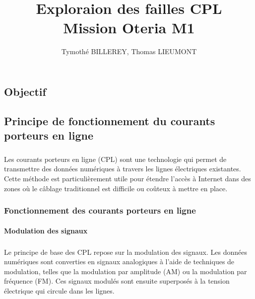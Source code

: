 \documentclass[a4paper,twocolumn]{report}
\title{\Huge{Exploraion des failles CPL}\\Mission Oteria M1}
\author{Tymothé BILLEREY, Thomas LIEUMONT}
\date{}
\begin{document}
\maketitle
\newpage %
\newpage
{}
\tableofcontents
\pagebreak

\chapter{}

\section{Objectif}
\paragraph{}

\section{Principe de fonctionnement du courants porteurs en ligne}
\paragraph{} Les courants porteurs en ligne (CPL) sont une technologie qui permet de transmettre des données numériques à travers les lignes électriques existantes. Cette méthode est particulièrement utile pour étendre l'accès à Internet dans des zones où le câblage traditionnel est difficile ou coûteux à mettre en place.

\subsection{Fonctionnement des courants porteurs en ligne}

\subsubsection{Modulation des signaux}
\paragraph{} Le principe de base des CPL repose sur la modulation des signaux. Les données numériques sont converties en signaux analogiques à l'aide de techniques de modulation, telles que la modulation par amplitude (AM) ou la modulation par fréquence (FM). Ces signaux modulés sont ensuite superposés à la tension électrique qui circule dans les lignes.
\end{document}
